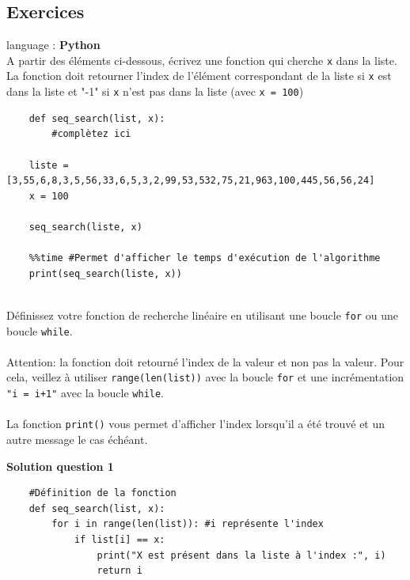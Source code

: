 \subsection{Exercices}

\begin{Exercice}[5 minutes] language : \textbf{Python}\\

A partir des éléments ci-dessous, écrivez une fonction qui cherche \lstinline{x} dans la liste.\\La fonction doit retourner l'index de l'élément correspondant de la liste si \lstinline{x} est dans la liste et "-1" si \lstinline{x} n'est pas dans la liste (avec \lstinline{x = 100})\\

\begin{verbatim}
    def seq_search(list, x):
        #complètez ici
        
    liste = [3,55,6,8,3,5,56,33,6,5,3,2,99,53,532,75,21,963,100,445,56,56,24]
    x = 100
    
    seq_search(liste, x)
        
    %%time #Permet d'afficher le temps d'exécution de l'algorithme 
    print(seq_search(liste, x))
    
\end{verbatim}

\begin{conseil}
    Définissez votre fonction de recherche linéaire en utilisant une boucle \lstinline{for} ou une boucle \lstinline{while}.\\\\
    Attention: la fonction doit retourné l'index de la valeur et non pas la valeur. Pour cela, veillez à utiliser \lstinline{range(len(list))} avec la boucle \lstinline{for} et une incrémentation \lstinline{"i = i+1"} avec la boucle \lstinline{while}.\\\\
    La fonction \lstinline{print()} vous permet d'afficher l'index lorsqu'il a été trouvé et un autre message le cas échéant. 
\end{conseil}
    
    
\textbf{Solution question 1}

\begin{verbatim}
    #Définition de la fonction
    def seq_search(list, x):
        for i in range(len(list)): #i représente l'index 
            if list[i] == x:
                print("X est présent dans la liste à l'index :", i)
                return i
                

\end{verbatim}
\end{Exercice}
